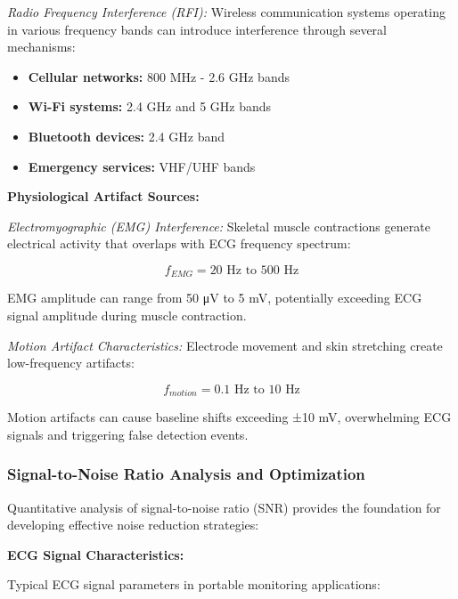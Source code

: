 \documentclass[12pt,a4paper]{article}
\begin{document}
\textit{Radio Frequency Interference (RFI):}
Wireless communication systems operating in various frequency bands can introduce interference through several mechanisms:

\begin{itemize}
\item \textbf{Cellular networks:} 800 MHz - 2.6 GHz bands
\item \textbf{Wi-Fi systems:} 2.4 GHz and 5 GHz bands  
\item \textbf{Bluetooth devices:} 2.4 GHz band
\item \textbf{Emergency services:} VHF/UHF bands
\end{itemize}

\vspace{0.5cm}

\textbf{Physiological Artifact Sources:}

\textit{Electromyographic (EMG) Interference:}
Skeletal muscle contractions generate electrical activity that overlaps with ECG frequency spectrum:

\begin{equation*}
f_{EMG} = 20 \text{ Hz to } 500 \text{ Hz}
\end{equation*}

EMG amplitude can range from 50 μV to 5 mV, potentially exceeding ECG signal amplitude during muscle contraction.

\textit{Motion Artifact Characteristics:}
Electrode movement and skin stretching create low-frequency artifacts:

\begin{equation*}
f_{motion} = 0.1 \text{ Hz to } 10 \text{ Hz}
\end{equation*}

Motion artifacts can cause baseline shifts exceeding ±10 mV, overwhelming ECG signals and triggering false detection events.

\subsubsection{Signal-to-Noise Ratio Analysis and Optimization}

Quantitative analysis of signal-to-noise ratio (SNR) provides the foundation for developing effective noise reduction strategies:

\vspace{0.5cm}

\textbf{ECG Signal Characteristics:}

Typical ECG signal parameters in portable monitoring applications:
\end{document}
